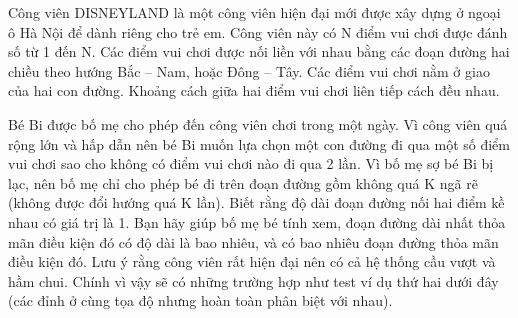 Công viên DISNEYLAND là một công viên hiện đại mới được xây dựng ở ngoại ô Hà Nội để dành riêng cho trẻ em. Công viên này có N điểm vui chơi được đánh số từ 1 đến N. Các điểm vui chơi được nối liền với nhau bằng các đoạn đường hai chiều theo hướng Bắc – Nam, hoặc Đông – Tây. Các điểm vui chơi nằm ở giao của hai con đường. Khoảng cách giữa hai điểm vui chơi liên tiếp cách đều nhau.  

   Bé Bi được bố mẹ cho phép đến công viên chơi trong một ngày. Vì công viên quá rộng lớn và hấp dẫn nên bé Bi muốn lựa chọn một con đường đi qua một số điểm vui chơi sao cho không có điểm vui chơi nào đi qua 2 lần. Vì bố mẹ sợ bé Bi bị lạc, nên bố mẹ chỉ cho phép bé đi trên đoạn đường gồm không quá K ngã rẽ (không được đổi hướng quá K lần). Biết rằng độ dài đoạn đường nối hai điểm kề nhau có giá trị là 1. Bạn hãy giúp bố mẹ bé tính xem, đoạn đường dài nhất thỏa mãn điều kiện đó có độ dài là bao nhiêu, và có bao nhiêu đoạn đường thỏa mãn điều kiện đó. Lưu ý rằng công viên rất hiện đại nên có cả hệ thống cầu vượt và hầm chui. Chính vì vậy sẽ có những trường hợp như test ví dụ thứ hai dưới đây (các đỉnh ở cùng tọa độ nhưng hoàn toàn phân biệt với nhau).  

\